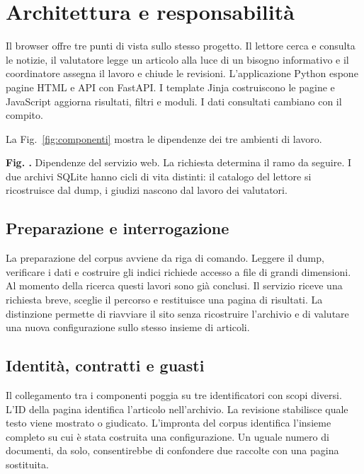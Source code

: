 \documentclass[11pt,a4paper]{article}
\newcommand{\legendnote}[2]{\refstepcounter{figure}\label{fig:#1}\par{\small\sffamily\color{ink}\textbf{Fig. \thefigure.} #2\par}}
\begin{document}
\clearpage

\section{Architettura e responsabilità}\label{architettura-e-responsabilituxe0}

Il browser offre tre punti di vista sullo stesso progetto. Il lettore cerca e consulta le notizie, il valutatore legge un articolo alla luce di un bisogno informativo e il coordinatore assegna il lavoro e chiude le revisioni. L'applicazione Python espone pagine HTML e API con FastAPI. I template Jinja costruiscono le pagine e JavaScript aggiorna risultati, filtri e moduli. I dati consultati cambiano con il compito.

La Fig.~\ref{fig:componenti} mostra le dipendenze dei tre ambienti di lavoro.


\legendnote{componenti}{Dipendenze del servizio web. La richiesta determina il ramo da seguire. I due archivi SQLite hanno cicli di vita distinti: il catalogo del lettore si ricostruisce dal dump, i giudizi nascono dal lavoro dei valutatori.}

\subsection{Preparazione e interrogazione}\label{preparazione-e-interrogazione}

La preparazione del corpus avviene da riga di comando. Leggere il dump, verificare i dati e costruire gli indici richiede accesso a file di grandi dimensioni. Al momento della ricerca questi lavori sono già conclusi. Il servizio riceve una richiesta breve, sceglie il percorso e restituisce una pagina di risultati. La distinzione permette di riavviare il sito senza ricostruire l'archivio e di valutare una nuova configurazione sullo stesso insieme di articoli.

\clearpage

\subsection{Identità, contratti e guasti}\label{identituxe0-contratti-e-guasti}

Il collegamento tra i componenti poggia su tre identificatori con scopi diversi. L'ID della pagina identifica l'articolo nell'archivio. La revisione stabilisce quale testo viene mostrato o giudicato. L'impronta del corpus identifica l'insieme completo su cui è stata costruita una configurazione. Un uguale numero di documenti, da solo, consentirebbe di confondere due raccolte con una pagina sostituita.
\end{document}
